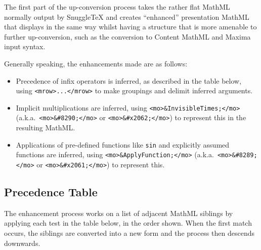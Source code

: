
\newcommand{\ue}[1]{\upConversionExample{#1}}

The first part of the up-conversion process takes the rather flat MathML normally
output by SnuggleTeX and creates ``enhanced'' presentation MathML that displays in the
same way whilst having a structure that is more amenable to further up-conversion,
such as the conversion to Content MathML and Maxima input syntax.

Generally speaking, the enhancements made are as follows:

\begin{itemize}
\item Precedence of infix operators is inferred, as described in the table
below, using \verb|<mrow>...</mrow>| to make groupings and delimit inferred arguments.
\item Implicit multiplications are inferred, using \verb|<mo>&InvisibleTimes;</mo>|
(a.k.a.\ \verb|<mo>&#8290;</mo>| or \verb|<mo>&#x2062;</mo>|)
to represent this in the resulting MathML.
\item Applications of pre-defined functions like \verb|sin| and explicitly assumed
functions are inferred, using
\verb|<mo>&ApplyFunction;</mo>| (a.k.a.\ \verb|<mo>&#8289;</mo>| or \verb|<mo>&#x2061;</mo>|)
to represent this.
\end{itemize}

\subsection*{Precedence Table}

The enhancement process works on a list of adjacent MathML siblings by applying
each test in the table below, in the order shown. When the first match occurs,
the siblings are converted into a new form and the process then descends
downwards.

